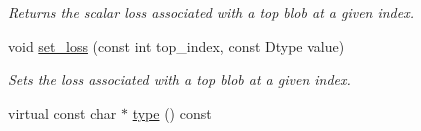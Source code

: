 \begin{DoxyCompactItemize}
\begin{DoxyCompactList}\small\item\em Returns the scalar loss associated with a top blob at a given index. \end{DoxyCompactList}\item 
void \hyperlink{classcaffe_1_1Layer_a899b09f4b91ada8545b3a43ee91e0d69}{set\+\_\+loss} (const int top\+\_\+index, const Dtype value)\hypertarget{classcaffe_1_1Layer_a899b09f4b91ada8545b3a43ee91e0d69}{}\label{classcaffe_1_1Layer_a899b09f4b91ada8545b3a43ee91e0d69}

\begin{DoxyCompactList}\small\item\em Sets the loss associated with a top blob at a given index. \end{DoxyCompactList}\item 
virtual const char $\ast$ \hyperlink{classcaffe_1_1Layer_a8c5deb0263ae572036c564d53902a08d}{type} () const \hypertarget{classcaffe_1_1Layer_a8c5deb0263ae572036c564d53902a08d}{}\label{classcaffe_1_1Layer_a8c5deb0263ae572036c564d53902a08d}


\end{DoxyCompactItemize}
